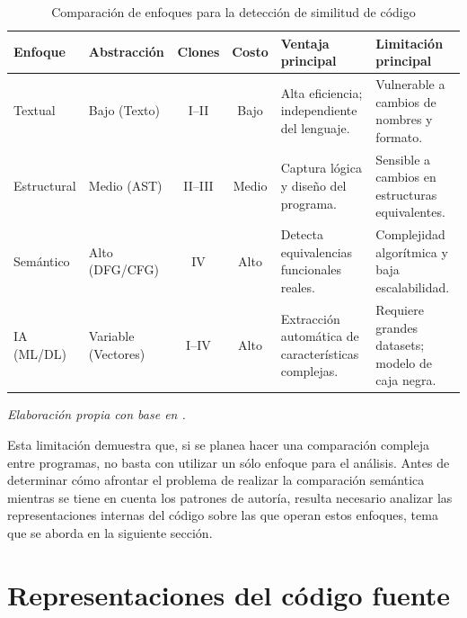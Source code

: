 { 
\renewcommand{\arraystretch}{1.5}
\small 
\begin{table}[H] 
    \centering
    \caption{Comparación de enfoques para la detección de similitud de código} 
    \label{tab:enfoques}
    \begin{tabularx}{\textwidth}{l >{\RaggedRight\arraybackslash}p{2.5cm} c c >{\RaggedRight\arraybackslash}X >{\RaggedRight\arraybackslash}X}
        \toprule
        \textbf{Enfoque} & \textbf{Abstracción} & \textbf{Clones} & \textbf{Costo} & \textbf{Ventaja principal} & \textbf{Limitación principal} \\
        \midrule
        Textual & Bajo (Texto) & I--II & Bajo & Alta eficiencia; independiente del lenguaje. & Vulnerable a cambios de nombres y formato. \\
        \addlinespace
        Estructural & Medio (AST) & II--III & Medio & Captura lógica y diseño del programa. & Sensible a cambios en estructuras equivalentes. \\
        \addlinespace
        Semántico & Alto (DFG/CFG) & IV & Alto & Detecta equivalencias funcionales reales. & Complejidad algorítmica y baja escalabilidad. \\
        \addlinespace
        IA (ML/DL) & Variable (Vectores) & I--IV & Alto & Extracción automática de características complejas. & Requiere grandes datasets; modelo de caja negra. \\
        \bottomrule
    \end{tabularx}
    
    \vspace{6pt} %
    {\footnotesize\textit{Elaboración propia con base en \cite{Roy2007Survey, karakatic2022software, Horvath2026ProgrammerAttribution, Yu2023Graph, Le2021DeepLearning, Alon2018Code2Vec}.}}
\end{table}
}

Esta limitación demuestra que, si se planea hacer una comparación compleja entre programas, no basta con utilizar un sólo enfoque para el análisis. Antes de determinar cómo afrontar el problema de realizar la comparación semántica mientras se tiene en cuenta los patrones de autoría, resulta necesario analizar las representaciones internas del código sobre las que operan estos enfoques, tema que se aborda en la siguiente sección.

\section{Representaciones del código fuente}

